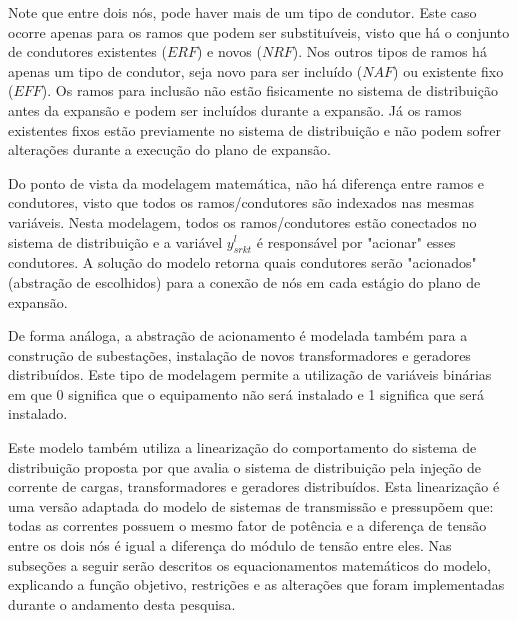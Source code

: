 

Note que entre dois nós, pode haver mais de um tipo de condutor. Este caso ocorre apenas para os ramos que podem ser substituíveis, visto que há o conjunto de condutores existentes ($ERF$) e novos ($NRF$). Nos outros tipos de ramos há apenas um tipo de condutor, seja novo para ser incluído ($NAF$) ou existente fixo ($EFF$). Os ramos para inclusão não estão fisicamente no sistema de distribuição antes da expansão e podem ser incluídos durante a expansão. Já os ramos existentes fixos estão previamente no sistema de distribuição e não podem sofrer alterações durante a execução do plano de expansão.

Do ponto de vista da modelagem matemática, não há diferença entre ramos e condutores, visto que todos os ramos/condutores são indexados nas mesmas variáveis. Nesta modelagem, todos os ramos/condutores estão conectados no sistema de distribuição e a variável  $y^l_{srkt}$ é responsável por "acionar" \; esses condutores. A solução do modelo retorna quais condutores serão "acionados"  \; (abstração de escolhidos) para a conexão de nós em cada estágio do plano de expansão.

De forma análoga, a abstração de acionamento é modelada também para a construção de subestações, instalação de novos transformadores e geradores distribuídos. Este tipo de modelagem permite a utilização de variáveis binárias em que 0 significa que o equipamento não será instalado e 1 significa que será instalado.

Este modelo também utiliza a linearização do comportamento do sistema de distribuição proposta por  que avalia o sistema de distribuição pela injeção de corrente de cargas, transformadores e geradores distribuídos. Esta linearização é uma versão adaptada do modelo de sistemas de transmissão e pressupõem que: todas as correntes possuem o mesmo fator de potência e a diferença de tensão entre os dois nós é igual a diferença do módulo de tensão entre eles. 
Nas subseções a seguir serão descritos os equacionamentos matemáticos do modelo, explicando a função objetivo, restrições e as alterações que foram implementadas durante o andamento desta pesquisa.


